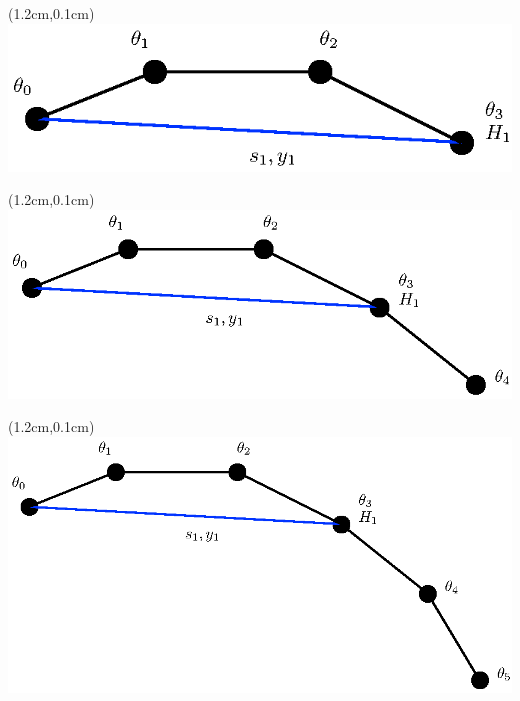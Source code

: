 \documentclass{beamer}
\begin{document}
							 \begin{frame}
\begin{textblock*}{0.2cm}(1.2cm,0.1cm) %
							 				\includegraphics[scale=0.5]{figures/6.eps}
\end{textblock*}
							 \end{frame}
							 \begin{frame}
\begin{textblock*}{0.2cm}(1.2cm,0.1cm) %
							 				\includegraphics[scale=0.5]{figures/5.eps}
\end{textblock*}
							 \end{frame}
							 \begin{frame}
\begin{textblock*}{0.2cm}(1.2cm,0.1cm) %
							 				\includegraphics[scale=0.5]{figures/4.eps}
\end{textblock*}
							 \end{frame}
\end{document}
